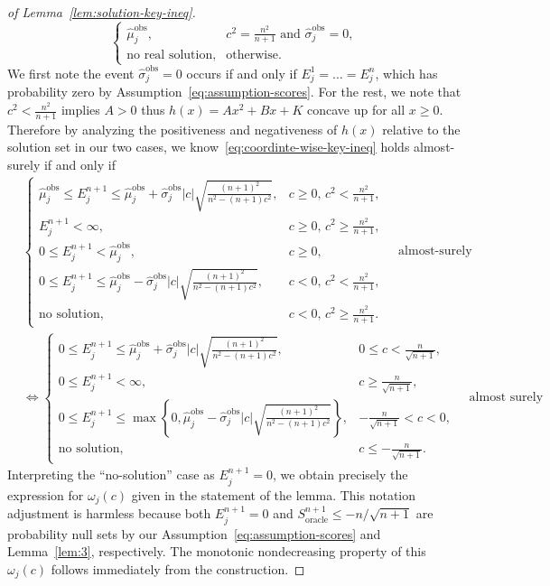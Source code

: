 \begin{proof}[of Lemma~\ref{lem:solution-key-ineq}]
\[\begin{cases}
    \hat{\mu}^\mathrm{obs}_j, & c^2 = \tfrac{n^2}{n+1} \text{ and } \hat{\sigma}^\mathrm{obs}_j = 0,\\
    \text{no real solution}, &\text{otherwise}.
\end{cases}
\]
We first note the event $\hat{\sigma}^\mathrm{obs}_j = 0$ occurs if and only if $E^1_j=\ldots=E^n_j$, which has probability zero by Assumption~\ref{eq:assumption-scores}. For the rest, we note that $c^2 < \tfrac{n^2}{n+1}$ implies $A>0$ thus $h(x) = Ax^2+Bx +K$ concave up for all $x \geq 0$. 
Therefore by analyzing the positiveness and negativeness of $h(x)$ relative to the solution set in our two cases, we know~\eqref{eq:coordinte-wise-key-ineq} holds almost-surely if and only if
\begin{align*}
    &\begin{cases}
    \hat{\mu}^\mathrm{obs}_j \leq E^{n+1}_j \leq \hat{\mu}^\mathrm{obs}_j+\hat{\sigma}^\mathrm{obs}_j|c|\sqrt{\tfrac{(n+1)^2}{n^2-(n+1)c^2}}, & c \geq 0,\, c^2 < \tfrac{n^2}{n+1}, \\[0.5em]
    E^{n+1}_j < \infty , & c \geq 0,\, c^2 \geq \tfrac{n^2}{n+1}, \\[0.5em]
    0 \leq E^{n+1}_j < \hat{\mu}^\mathrm{obs}_j, & c \geq 0, \\[0.5em]
    0\leq E^{n+1}_j \leq \hat{\mu}^\mathrm{obs}_j-\hat{\sigma}^\mathrm{obs}_j|c|\sqrt{\tfrac{(n+1)^2}{n^2-(n+1)c^2}}, & c < 0,\, c^2 < \tfrac{n^2}{n+1}, \\[0.5em]
    \text{no solution}, & c < 0,\, c^2 \geq \tfrac{n^2}{n+1}.
    \end{cases} \quad \text{almost-surely}\\
    &\iff \begin{cases}
    0 \leq E^{n+1}_j \leq \hat{\mu}^\mathrm{obs}_j+\hat{\sigma}^\mathrm{obs}_j|c|\sqrt{\tfrac{(n+1)^2}{n^2-(n+1)c^2}}, & 0\leq c < \tfrac{n}{\sqrt{n+1}}, \\[0.5em]
    0\leq E^{n+1}_j < \infty , & c\geq\tfrac{n}{\sqrt{n+1}}, \\[0.5em]
    0\leq E^{n+1}_j \leq \max\left\{0, \hat{\mu}^\mathrm{obs}_j-\hat{\sigma}^\mathrm{obs}_j|c|\sqrt{\tfrac{(n+1)^2}{n^2-(n+1)c^2}}\right\}, & -\tfrac{n}{\sqrt{n+1}} < c<0, \\[0.5em]
    \text{no solution}, & c \leq - \tfrac{n}{\sqrt{n+1}}.
    \end{cases}\quad \text{almost surely}
\end{align*}
Interpreting the ``no-solution'' case as $E^{n+1}_j = 0$, we obtain precisely the expression for $\omega_j(c)$ given in the statement of the lemma. This notation adjustment is harmless because both $E^{n+1}_j = 0$ and $S^{n+1}_{\mathrm{oracle}} \leq -n/\sqrt{n+1}$ are probability null sets by our Assumption~\ref{eq:assumption-scores} and Lemma~\ref{lem:3}, respectively.
The monotonic nondecreasing property of this $\omega_j(c)$ follows immediately from the construction.
\end{proof}

